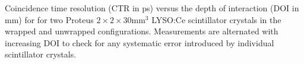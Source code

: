 \label{fig:ctrvsdoi} Coincidence time resolution (CTR in ps) versus the depth of interaction (DOI in mm) for
for two Proteus $2\times2\times30$mm$^3$ LYSO:Ce scintillator crystals in the wrapped and unwrapped configurations. Measurements are alternated with increasing DOI to check for any systematic error introduced by individual scintillator crystals.